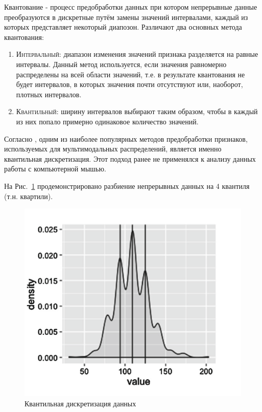 \documentclass[12pt]{article}
\begin{document}
    \par Квантование \cite{BINNING} - процесс предобработки данных при котором непрерывные данные преобразуются в дискретные путём замены значений интервалами, каждый из которых представляет некоторый диапозон. Различают два основных метода квантования:
    \begin{enumerate}
        \item \textsc{Интервальный}: диапазон изменения значений признака разделяется на равные интервалы. Данный метод используется, если значения равномерно распределены на всей области значений, т.е. в результате квантования не будет интервалов, в которых значения почти отсутствуют или, наоборот, плотных интервалов.
        \item \textsc{Квантильный}: ширину интервалов выбирают таким образом, чтобы в каждый из них попало примерно одинаковое количество значений.
    \end{enumerate}

    \par Согласно \cite{Kazachuk}, одним из наиболее популярных методов предобработки признаков, используемых для мультимодальных распределений, является именно квантильная дискретизация. Этот подход ранее не применялся к анализу данных работы с компьютерной мышью. \\

    \par На Рис.~\ref{sec:Research:FeatureSpace:Quantile:fig:Quantile} продемонстрировано разбиение непрерывных данных на 4 квантиля (т.н. квартили).

    \begin{figure}[h]
        \centering
        \includegraphics[width=0.6\linewidth]{quantile.png}
        \caption{Квантильная дискретизация данных}
        \label{sec:Research:FeatureSpace:Quantile:fig:Quantile}
    \end{figure}
\end{document}
